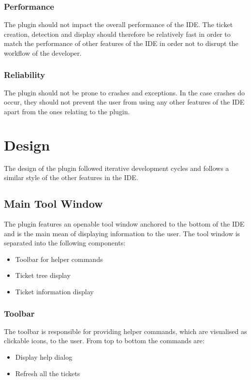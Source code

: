\documentclass{4thYearProject}
\begin{document}
\subsection{Performance}

The plugin should not impact the overall performance of the IDE. The ticket creation, detection and display should therefore be relatively fast in order to match the performance of other features of the IDE in order not to disrupt the workflow of the developer. 

\subsection{Reliability}

The plugin should not be prone to crashes and exceptions. In the case crashes do occur, they should not prevent the user from using any other features of the IDE apart from the ones relating to the plugin.  


\chapter{Design}

The design of the plugin followed iterative development cycles and follows a similar style of the other features in the IDE. 

\section{Main Tool Window}

The plugin features an openable tool window anchored to the bottom of the IDE and is the main mean of displaying information to the user. The tool window is separated into the following components: 

\begin{itemize}
\item Toolbar for helper commands
\item Ticket tree display
\item Ticket information display
\end{itemize}

\subsection{Toolbar}\label{sec:toolbar}

The toolbar is responsible for providing helper commands, which are visualised as clickable icons, to the user. \newline
From top to bottom the commands are:
\begin{itemize}
\item Display help dialog
\item Refresh all the tickets
\end{itemize}
\end{document}
